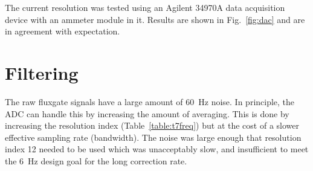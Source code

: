 The current resolution was tested using an Agilent 34970A data acquisition device with an ammeter module in it. Results are shown in Fig.~\ref{fig:dac} and are in agreement with expectation.









\section{Filtering}\label{sec:filter}

The raw fluxgate signals have a large amount of $60$~Hz noise. In principle, the ADC can handle this by increasing the amount of averaging. This is done by increasing the resolution index (Table~\ref{table:t7freq}) but at the cost of a slower effective sampling rate (bandwidth). The noise was large enough that resolution index 12 needed to be used which was unacceptably slow, and insufficient to meet the 6~Hz design goal for the long correction rate. 

